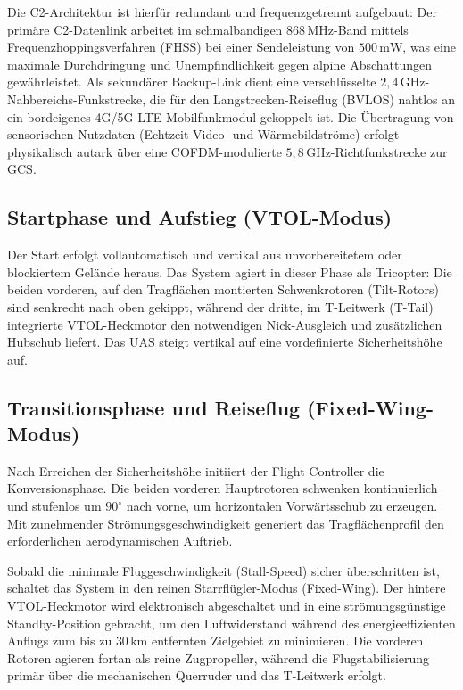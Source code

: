 Die C2-Architektur ist hierfür redundant und frequenzgetrennt aufgebaut: Der primäre C2-Datenlink arbeitet im schmalbandigen $868\,\text{MHz}$-Band mittels 
Frequenzhoppingsverfahren (FHSS) bei einer Sendeleistung von $500\,\text{mW}$, was eine maximale Durchdringung und Unempfindlichkeit gegen alpine Abschattungen gewährleistet. 
Als sekundärer Backup-Link dient eine verschlüsselte $2{,}4\,\text{GHz}$-Nahbereichs-Funkstrecke, die für den Langstrecken-Reiseflug (BVLOS) nahtlos an ein bordeigenes 4G/5G-LTE-Mobilfunkmodul gekoppelt ist. 
Die Übertragung von sensorischen Nutzdaten (Echtzeit-Video- und Wärmebildströme) erfolgt physikalisch autark über eine COFDM-modulierte $5{,}8\,\text{GHz}$-Richtfunkstrecke zur GCS.

\subsection{Startphase und Aufstieg (VTOL-Modus)}
Der Start erfolgt vollautomatisch und vertikal aus unvorbereitetem oder blockiertem Gelände heraus. Das System agiert in dieser Phase als Tricopter: 
Die beiden vorderen, auf den Tragflächen montierten Schwenkrotoren (Tilt-Rotors) sind senkrecht nach oben gekippt, während der dritte, im T-Leitwerk (T-Tail) 
integrierte VTOL-Heckmotor den notwendigen Nick-Ausgleich und zusätzlichen Hubschub liefert. Das UAS steigt vertikal auf eine vordefinierte Sicherheitshöhe auf.

\subsection{Transitionsphase und Reiseflug (Fixed-Wing-Modus)}
Nach Erreichen der Sicherheitshöhe initiiert der Flight Controller die Konversionsphase. Die beiden vorderen Hauptrotoren schwenken kontinuierlich und stufenlos 
um $90^\circ$ nach vorne, um horizontalen Vorwärtsschub zu erzeugen. Mit zunehmender Strömungsgeschwindigkeit generiert das Tragflächenprofil den erforderlichen aerodynamischen Auftrieb. 

Sobald die minimale Fluggeschwindigkeit (Stall-Speed) sicher überschritten ist, schaltet das System in den reinen Starrflügler-Modus (Fixed-Wing). 
Der hintere VTOL-Heckmotor wird elektronisch abgeschaltet und in eine strömungsgünstige Standby-Position gebracht, 
um den Luftwiderstand während des energieeffizienten Anflugs zum bis zu $30\,\text{km}$ entfernten Zielgebiet zu minimieren. Die vorderen Rotoren agieren fortan als reine Zugpropeller, 
während die Flugstabilisierung primär über die mechanischen Querruder und das T-Leitwerk erfolgt.

